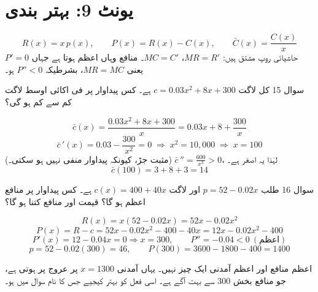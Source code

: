 \section*{یونٹ \textenglish{9}: بہتر بندی}

\begin{nukta}
\[
R(x)=x\,p(x),\qquad P(x)=R(x)-C(x),\qquad \bar{C}(x)=\frac{C(x)}{x}
\]
حاشیائی روپ مشتق ہیں: \(MR=R'\)، \(MC=C'\)۔ منافع وہاں اعظم ہوتا ہے جہاں
\(P'=0\) یعنی \(MR=MC\)، بشرطیکہ \(P''<0\) ہو۔
\end{nukta}

\begin{sawal}{سوال \textenglish{15}}
کل لاگت \(c=0.03x^{2}+8x+300\) ہے۔ کس پیداوار پر فی اکائی اوسط لاگت کم سے کم ہو
گی؟
\end{sawal}

\begin{hal}
\[
\bar{c}(x)=\frac{0.03x^{2}+8x+300}{x}=0.03x+8+\frac{300}{x}
\]
\[
\bar{c}\,'(x)=0.03-\frac{300}{x^{2}}=0
\;\Longrightarrow\;
x^{2}=10{,}000 \;\Longrightarrow\; x=100
\]
(مثبت جڑ، کیونکہ پیداوار منفی نہیں ہو سکتی۔)
\(\bar{c}\,''=\tfrac{600}{x^{3}}>0\)، لہٰذا یہ اصغر ہے۔
\[
\bar{c}(100)=3+8+3=14
\]

\end{hal}

\begin{sawal}{سوال \textenglish{16}}
طلب \(p=52-0.02x\) اور لاگت \(c(x)=400+40x\) ہے۔ کس پیداوار پر منافع اعظم ہو گا؟
قیمت اور منافع کتنا ہو گا؟
\end{sawal}

\begin{hal}
\[
R(x)=x(52-0.02x)=52x-0.02x^{2}
\]
\[
P(x)=R-c=52x-0.02x^{2}-400-40x=12x-0.02x^{2}-400
\]
\[
P'(x)=12-0.04x=0 \Rightarrow x=300,
\qquad P''=-0.04<0 \ (\text{اعظم})
\]
\[
p=52-0.02(300)=46,
\qquad
P(300)=3600-1800-400=1400
\]

\end{hal}

\begin{ghalti}
اعظم منافع اور اعظم آمدنی ایک چیز نہیں۔ یہاں آمدنی \(x=1300\) پر عروج پر ہوتی
ہے، جو منافع بخش \textenglish{300} سے بہت آگے ہے۔ اسی فعل کو بہتر کیجیے جس کا
نام سوال میں ہو۔
\end{ghalti}
